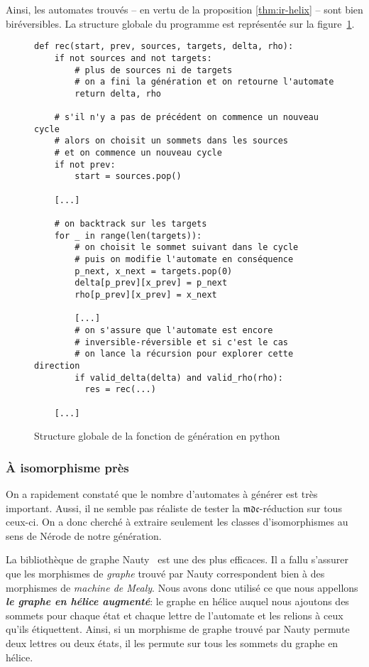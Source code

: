 \documentclass[11pt,a4paper]{article}
\begin{document}
Ainsi, les automates trouvés -- en vertu de la proposition \ref{thm:ir-helix} -- sont bien biréversibles. La structure globale du programme est représentée sur la figure~\ref{fig:gen-pseudo-code}.

\begin{figure}[h]
\begin{verbatim}
def rec(start, prev, sources, targets, delta, rho):
    if not sources and not targets:
        # plus de sources ni de targets
        # on a fini la génération et on retourne l'automate
        return delta, rho

    # s'il n'y a pas de précédent on commence un nouveau cycle
    # alors on choisit un sommets dans les sources
    # et on commence un nouveau cycle
    if not prev:
        start = sources.pop()

    [...]

    # on backtrack sur les targets
    for _ in range(len(targets)):
        # on choisit le sommet suivant dans le cycle
        # puis on modifie l'automate en conséquence
        p_next, x_next = targets.pop(0)
        delta[p_prev][x_prev] = p_next
        rho[p_prev][x_prev] = x_next

        [...]
        # on s'assure que l'automate est encore
        # inversible-réversible et si c'est le cas
        # on lance la récursion pour explorer cette direction
        if valid_delta(delta) and valid_rho(rho):
          res = rec(...)

    [...]

\end{verbatim}
  \caption{Structure globale de la fonction de génération en python\label{fig:gen-pseudo-code}}
\end{figure}

\subsubsection*{À isomorphisme près}

On a rapidement constaté que le nombre d'automates à générer est très important. Aussi, il ne semble pas réaliste de tester la $\mathfrak{mdc}$-réduction sur tous ceux-ci. On a donc cherché à extraire seulement les classes d'isomorphismes au sens de Nérode de notre génération.

La bibliothèque de graphe \textrm{Nauty}~\cite{Nauty} est une des plus efficaces. Il a fallu s'assurer que les morphismes de \textit{graphe} trouvé par \textrm{Nauty} correspondent bien à des morphismes de \textit{machine de Mealy}. Nous avons donc utilisé ce que nous appellons \textit{\textbf{le graphe en hélice augmenté}}: le graphe en hélice auquel nous ajoutons des sommets pour chaque état et chaque lettre de l'automate et les relions à ceux qu'ils étiquettent. Ainsi, si un morphisme de graphe trouvé par Nauty permute deux lettres ou deux états, il les permute sur tous les sommets du graphe en hélice.
\end{document}
